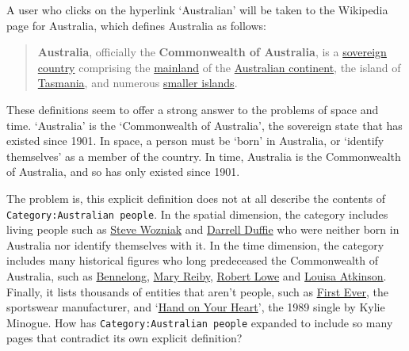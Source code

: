 \documentclass[
  a4paper,
  DIV=11,
  numbers=noendperiod]{scrreprt}
\begin{document}
A user who clicks on the hyperlink `Australian' will be taken to the
Wikipedia page for Australia, which defines Australia as follows:

\begin{quote}
\textbf{Australia}, officially the \textbf{Commonwealth of Australia},
is a
\href{https://en.wikipedia.org/w/index.php?title=Sovereign_state\&oldid=1182523263}{sovereign
country} comprising the
\href{https://en.wikipedia.org/w/index.php?title=Mainland_Australia\&oldid=1179467610}{mainland}
of the
\href{https://en.wikipedia.org/w/index.php?title=Australia_(continent)\&oldid=1182388022}{Australian
continent}, the island of
\href{https://en.wikipedia.org/w/index.php?title=Tasmania\&oldid=1181384565}{Tasmania},
and numerous
\href{https://en.wikipedia.org/w/index.php?title=List_of_islands_of_Australia\&oldid=1174981257}{smaller
islands}.
\end{quote}

These definitions seem to offer a strong answer to the problems of space
and time. `Australia' is the `Commonwealth of Australia', the sovereign
state that has existed since 1901. In space, a person must be `born' in
Australia, or `identify themselves' as a member of the country. In time,
Australia is the Commonwealth of Australia, and so has only existed
since 1901.

The problem is, this explicit definition does not at all describe the
contents of \texttt{Category:Australian\ people}. In the spatial
dimension, the category includes living people such as
\href{https://en.wikipedia.org/w/index.php?title=Steve_Wozniak\&oldid=1182335281}{Steve
Wozniak} and
\href{https://en.wikipedia.org/w/index.php?title=Darrell_Duffie\&oldid=1168175801}{Darrell
Duffie} who were neither born in Australia nor identify themselves with
it. In the time dimension, the category includes many historical figures
who long predeceased the Commonwealth of Australia, such as
\href{https://en.wikipedia.org/w/index.php?title=Bennelong\&oldid=1182881508}{Bennelong},
\href{https://en.wikipedia.org/w/index.php?title=Mary_Reibey\&oldid=1182294588}{Mary
Reiby},
\href{https://en.wikipedia.org/w/index.php?title=Robert_Lowe\&oldid=1176772405}{Robert
Lowe} and
\href{https://en.wikipedia.org/w/index.php?title=Louisa_Atkinson\&oldid=1178386165}{Louisa
Atkinson}. Finally, it lists thousands of entities that aren't people,
such as
\href{https://en.wikipedia.org/w/index.php?title=First_Ever\&oldid=1177339020}{First
Ever}, the sportswear manufacturer, and
`\href{https://en.wikipedia.org/w/index.php?title=Hand_on_Your_Heart\&oldid=1181812572}{Hand
on Your Heart}', the 1989 single by Kylie Minogue. How has
\texttt{Category:Australian\ people} expanded to include so many pages
that contradict its own explicit definition?
\end{document}
